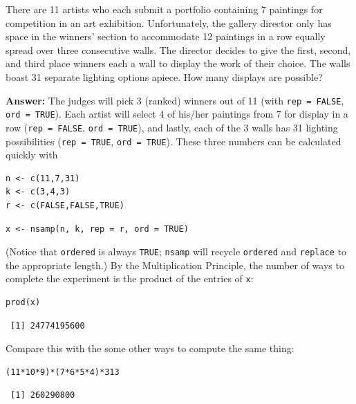 \documentclass[captions=tableheading]{scrbook}
\begin{document}
\begin{example}
There are 11 artists who each submit a portfolio containing 7 paintings for competition in an art exhibition. Unfortunately, the gallery director only has space in the winners' section to accommodate 12 paintings in a row equally spread over three consecutive walls. The director decides to give the first, second, and third place winners each a wall to display the work of their choice. The walls boast 31 separate lighting options apiece. How many displays are possible?

\textbf{Answer:} The judges will pick 3 (ranked) winners out of 11 (with \texttt{rep = FALSE}, \texttt{ord = TRUE}). Each artist will select 4 of his/her paintings from 7 for display in a row (\texttt{rep = FALSE}, \texttt{ord = TRUE}), and lastly, each of the 3 walls has 31 lighting possibilities (\texttt{rep = TRUE}, \texttt{ord = TRUE}). These three numbers can be calculated quickly with 


\lstset{language=R}
\begin{lstlisting}
n <- c(11,7,31) 
k <- c(3,4,3) 
r <- c(FALSE,FALSE,TRUE)
\end{lstlisting}


\lstset{language=R}
\begin{lstlisting}
x <- nsamp(n, k, rep = r, ord = TRUE)
\end{lstlisting}

(Notice that \texttt{ordered} is always \texttt{TRUE}; \texttt{nsamp} will recycle \texttt{ordered} and \texttt{replace} to the appropriate length.) By the Multiplication Principle, the number of ways to complete the experiment is the product of the entries of \texttt{x}: 


\lstset{language=R}
\begin{lstlisting}
prod(x)
\end{lstlisting}

\begin{verbatim}
 [1] 24774195600
\end{verbatim}

Compare this with the some other ways to compute the same thing: 


\lstset{language=R}
\begin{lstlisting}
(11*10*9)*(7*6*5*4)*313
\end{lstlisting}

\begin{verbatim}
 [1] 260290800
\end{verbatim}


\end{example}
\end{document}

